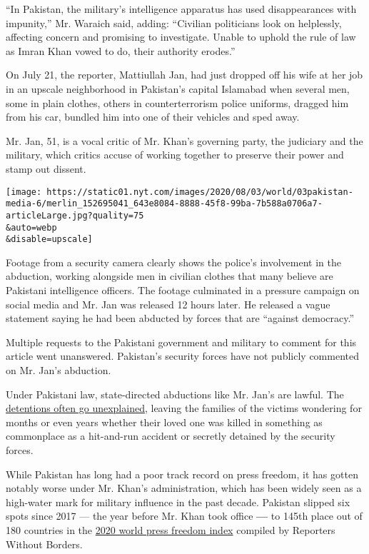 ``In Pakistan, the military's intelligence apparatus has used
disappearances with impunity,'' Mr. Waraich said, adding: ``Civilian
politicians look on helplessly, affecting concern and promising to
investigate. Unable to uphold the rule of law as Imran Khan vowed to do,
their authority erodes.''

On July 21, the reporter, Mattiullah Jan, had just dropped off his wife
at her job in an upscale neighborhood in Pakistan's capital Islamabad
when several men, some in plain clothes, others in counterterrorism
police uniforms, dragged him from his car, bundled him into one of their
vehicles and sped away.

Mr. Jan, 51, is a vocal critic of Mr. Khan's governing party, the
judiciary and the military, which critics accuse of working together to
preserve their power and stamp out dissent.

\texttt{[image: https://static01.nyt.com/images/2020/08/03/world/03pakistan-media-6/merlin\_152695041\_643e8084-8888-45f8-99ba-7b588a0706a7-articleLarge.jpg?quality=75\\\&auto=webp\\\&disable=upscale]}

Footage from a security camera clearly shows the police's involvement in
the abduction, working alongside men in civilian clothes that many
believe are Pakistani intelligence officers. The footage culminated in a
pressure campaign on social media and Mr. Jan was released 12 hours
later. He released a vague statement saying he had been abducted by
forces that are ``against democracy.''

Multiple requests to the Pakistani government and military to comment
for this article went unanswered. Pakistan's security forces have not
publicly commented on Mr. Jan's abduction.

Under Pakistani law, state-directed abductions like Mr. Jan's are
lawful. The
\href{https://www.nytimes.com/2007/01/14/world/asia/14pakistan.html}{detentions
often go unexplained}, leaving the families of the victims wondering for
months or even years whether their loved one was killed in something as
commonplace as a hit-and-run accident or secretly detained by the
security forces.

While Pakistan has long had a poor track record on press freedom, it has
gotten notably worse under Mr. Khan's administration, which has been
widely seen as a high-water mark for military influence in the past
decade. Pakistan slipped six spots since 2017 --- the year before Mr.
Khan took office \textbf{---} to 145th place out of 180 countries in the
\href{https://rsf.org/en/pakistan}{2020 world press freedom index}
compiled by Reporters Without Borders.

